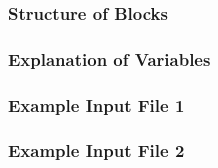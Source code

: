 \vspace{5mm}
\subsubsection{Structure of Blocks}


\vspace{5mm}
\subsubsection{Explanation of Variables}
\begin{description}

\end{description}

\vspace{5mm}
\subsubsection{Example Input File 1}


\vspace{5mm}
\subsubsection{Example Input File 2}

